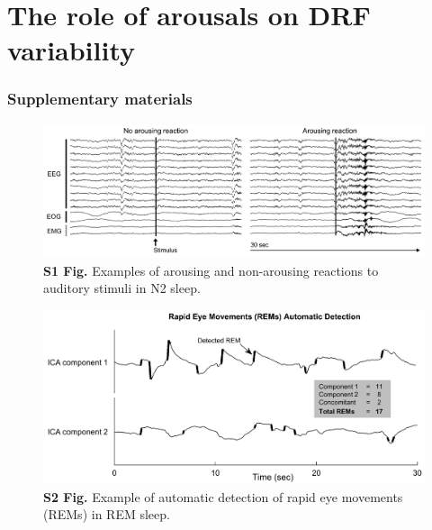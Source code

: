 \cleardoublepage

\chapter{The role of arousals on DRF variability}
\label{res:arousal}

\cleardoublepage



\cleardoublepage

\subsection*{Supplementary materials}
\label{res:arousal:supp}
\vspace*{1cm}

\begin{figure}[htbp]
	\includegraphics[width=\textwidth]{Fig/Results/Arousals/S1_Fig.png}
	\caption*{\textbf{S1 Fig.} Examples of arousing and non-arousing reactions to auditory stimuli in N2 sleep.}
\end{figure}

\vspace*{3cm}

\begin{figure}[htbp]
	\includegraphics[width=\textwidth]{Fig/Results/Arousals/S2_Fig.png}
	\caption*{\textbf{S2 Fig.} Example of automatic detection of rapid eye movements (REMs) in REM sleep. }
\end{figure}

